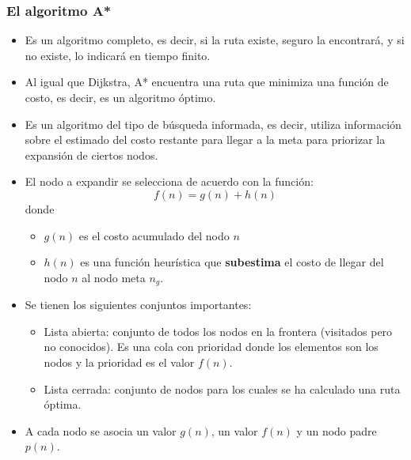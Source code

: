 \begin{frame}\frametitle{El algoritmo A*}
  \begin{itemize}
  \item Es un algoritmo completo, es decir, si la ruta existe, seguro la encontrará, y si no existe, lo indicará en tiempo finito.
  \item Al igual que Dijkstra, A* encuentra una ruta que minimiza una función de costo, es decir, es un algoritmo óptimo.
  \item Es un algoritmo del tipo de búsqueda informada, es decir, utiliza información sobre el estimado del costo restante para llegar a la meta para priorizar la expansión de ciertos nodos. 
  \item El nodo a expandir se selecciona de acuerdo con la función:
    \[f(n) = g(n) + h(n)\]
    donde
    \begin{itemize}
    \item $g(n)$ es el costo acumulado del nodo $n$
    \item $h(n)$ es una función heurística que \textbf{subestima} el costo de llegar del nodo $n$ al nodo meta $n_g$. 
    \end{itemize}
  \item Se tienen los siguientes conjuntos importantes:
    \begin{itemize}
    \item Lista abierta: conjunto de todos los nodos en la frontera (visitados pero no conocidos). Es una cola con prioridad donde los elementos son los nodos y la prioridad es el valor $f(n)$.
    \item Lista cerrada: conjunto de nodos para los cuales se ha calculado una ruta óptima. 
    \end{itemize}
    \item A cada nodo se asocia un valor $g(n)$, un valor $f(n)$ y un nodo padre $p(n)$. 
  \end{itemize}
\end{frame}

